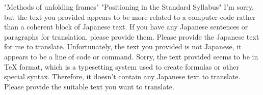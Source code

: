 "Methods of unfolding frames"
"Positioning in the Standard Syllabus"
I'm sorry, but the text you provided appears to be more related to a computer code rather than a coherent block of Japanese text. If you have any Japanese sentences or paragraphs for translation, please provide them.
Please provide the Japanese text for me to translate. Unfortunately, the text you provided is not Japanese, it appears to be a line of code or command.
Sorry, the text provided seems to be in TeX format, which is a typesetting system used to create formulas or other special syntax. Therefore, it doesn't contain any Japanese text to translate. Please provide the suitable text you want to translate.
